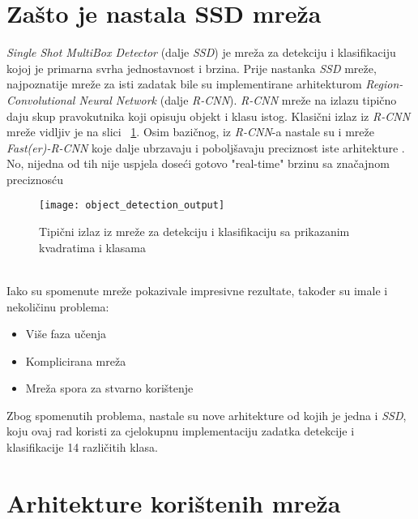 \section{Zašto je nastala SSD mreža}
\emph{Single Shot MultiBox Detector} (dalje \emph{SSD}) je mreža za detekciju i klasifikaciju kojoj je primarna svrha jednostavnost i brzina.
Prije nastanka \emph{SSD} mreže, najpoznatije mreže za isti zadatak bile su implementirane arhitekturom \emph{Region-Convolutional Neural Network} (dalje \emph{R-CNN}).
\emph{R-CNN} mreže na izlazu tipično daju skup pravokutnika koji opisuju objekt i klasu istog.
Klasični izlaz iz \emph{R-CNN} mreže vidljiv je na slici ~\ref{fig:ObjectDetectionOutput}.
Osim bazičnog, iz \emph{R-CNN}-a nastale su i mreže \emph{Fast(er)-R-CNN} koje dalje ubrzavaju i poboljšavaju preciznost iste arhitekture \cite{ren2015faster}.
No, nijedna od tih nije uspjela doseći gotovo "real-time" brzinu sa značajnom preciznosću
\begin{figure}[h!]
	\centering
	\texttt{[image: object\_detection\_output]}
	 \caption{Tipični izlaz iz mreže za detekciju i klasifikaciju sa prikazanim kvadratima i klasama}
 	 \label{fig:ObjectDetectionOutput}
\end{figure} \\
Iako su spomenute mreže pokazivale impresivne rezultate, također su imale i nekoličinu problema:
\begin{itemize}
\item Više faza učenja
\item Komplicirana mreža
\item Mreža spora za stvarno korištenje
\end{itemize}
Zbog spomenutih problema, nastale su nove arhitekture od kojih je jedna i \emph{SSD}, koju ovaj rad koristi za cjelokupnu implementaciju zadatka detekcije i klasifikacije 14 različitih klasa.

\section{Arhitekture korištenih mreža}
